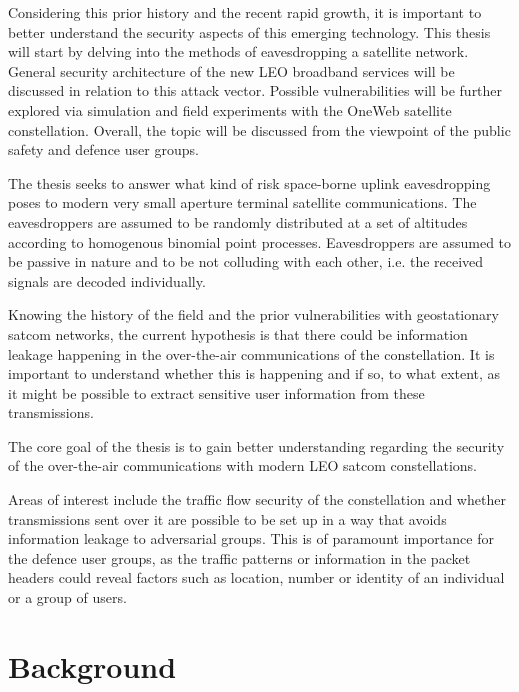 \documentclass[english, 12pt, a4paper, elec, utf8, a-1b, online]{aaltothesis}
\begin{document}
Considering this prior history and the recent rapid growth, it is important to better understand the security aspects of this emerging technology. This thesis will start by delving into the methods of eavesdropping a satellite network. General security architecture of the new LEO broadband services will be discussed in relation to this attack vector. Possible vulnerabilities will be further explored via simulation and field experiments with the OneWeb satellite constellation. Overall, the topic will be discussed from the viewpoint of the public safety and defence user groups.

The thesis seeks to answer what kind of risk space-borne uplink eavesdropping poses to modern very small aperture terminal satellite communications. The eavesdroppers are assumed to be randomly distributed at a set of altitudes according to homogenous binomial point processes. Eavesdroppers are assumed to be passive in nature and to be not colluding with each other, i.e. the received signals are decoded individually.

Knowing the history of the field and the prior vulnerabilities with geostationary satcom networks, the current hypothesis is that there could be information leakage happening in the over-the-air communications of the constellation. It is important to understand whether this is happening and if so, to what extent, as it might be possible to extract sensitive user information from these transmissions.

The core goal of the thesis is to gain better understanding regarding the security of the over-the-air communications with modern LEO satcom constellations.

Areas of interest include the traffic flow security of the constellation and whether transmissions sent over it are possible to be set up in a way that avoids information leakage to adversarial groups. This is of paramount importance for the defence user groups, as the traffic patterns or information in the packet headers could reveal factors such as location, number or identity of an individual or a group of users.

\clearpage

\section{Background}
\end{document}
